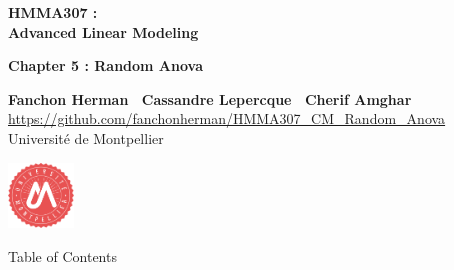 \documentclass[unknownkeysallowed]{beamer}
\begin{document}



\begin{frame}
\bigskip
\bigskip
\begin{center}{
\LARGE\color{marron}
\textbf{HMMA307 : \\ Advanced Linear Modeling}
\textbf{ }\\
\vspace{0.5cm}
}

\color{marron}
\textbf{Chapter 5 : Random Anova}
\end{center}

\vspace{0.5cm}

\begin{center}
\textbf{Fanchon Herman \ Cassandre Lepercque \ Cherif Amghar} \\
\vspace{0.1cm}
\url{https://github.com/fanchonherman/HMMA307_CM_Random_Anova}\\
\vspace{0.5cm}
Université de Montpellier \\
\end{center}

\centering
\includegraphics[width=0.13\textwidth]{Logo}

\end{frame}






\begin{frame}{Table of Contents}
\tableofcontents[hideallsubsections]
\end{frame}
\end{document}
